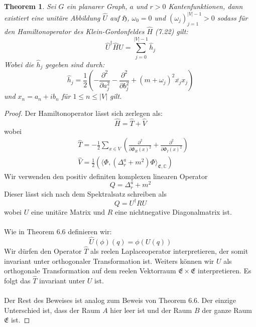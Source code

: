 \documentclass[11pt,a4paper,leqno]{report}
\newtheorem{theorem}{Theorem}[chapter]
\numberwithin{equation}{chapter}
\begin{document}
\begin{theorem}
	Sei $G$ ein planarer Graph, $a$ und $r>0$ Kantenfunktionen, dann existiert eine unit\"are Abbildung $\hat{U}$ auf $\mathfrak{H}$, $\omega_0=0$ und $(\omega_j)_{j=1}^{|V|-1}>0$ sodass f\"ur den Hamiltonoperator des Klein-Gordonfeldes $\hat{H}$ (7.22) gilt:
	\begin{equation}
		\hat{U}^\dagger\hat{H}\hat{U}  = \sum_{j=0}^{|V|-1}\hat{h}_j
	\end{equation}
	Wobei die $\hat{h}_j$ gegeben sind durch:
	\begin{equation}
		\hat{h}_j= \frac{1}{2}(-\frac{\partial^2}{\partial a_j^2}-\frac{\partial^2}{\partial b_j^2} + (m + \omega_j)^2 \overline{x_j}x_j)
	\end{equation}	
	und $x_n = a_n + i b_n$ f\"ur $1\leq n\leq |V|$ gilt.
\end{theorem}
\begin{proof} 
	Der Hamiltonoperator l\"asst sich zerlegen als:
\begin{equation*}
	\hat{H} = \hat{T} + \hat{V}
\end{equation*}
wobei
\begin{align*}
	&\hat{T} = -\frac{1}{2}\sum_{x\in V}(\frac{\partial^2}{\partial \Phi_{R}(x)^2}+\frac{\partial^2}{\partial \Phi_{I}(x)^2})\\
	&\hat{V} = \frac{1}{2}(\langle \Phi, (\Delta^{a}_r+ m^2)\Phi\rangle_{\mathfrak{E},\mathbb{C}})
\end{align*}
	Wir verwenden den positiv definiten komplexen linearen Operator
	\begin{equation*}
		Q= \Delta^{a}_r+ m^2
	\end{equation*}
Dieser l\"asst sich nach dem Spektralsatz schreiben als
	\begin{equation*}
	Q = U^\dagger R U
\end{equation*}
wobei $U$ eine unit\"are Matrix und $R$ eine nichtnegative Diagonalmatrix ist.\\
\\
Wie in Theorem 6.6 definieren wir: 
	\begin{equation*}
	\hat{U}(\phi)(q)=\phi(U(q))
\end{equation*}
Wir d\"urfen den Operator $\hat{T}$ als reelen Laplaceoperator interpretieren, der somit invariant unter orthogonaler Transformation ist. Weiters k\"onnen wir $U$ als orthogonale Transformation auf dem reelen Vektorraum $\mathfrak{E}\times\mathfrak{E}$ interpretieren. Es folgt das $\hat{T}$ invariant unter $U$ ist.\\
\\
Der Rest des Beweises ist analog zum Beweis von Theorem 6.6. Der einzige Unterschied ist, dass der Raum $A$ hier leer ist und der Raum $B$ der ganze Raum $\mathfrak{E}$ ist.
\end{proof}
\end{document}
